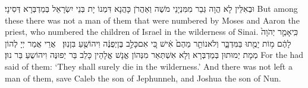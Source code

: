 {וּבְאִלֵּין לָא הֲוָה גְּבַר מִמִּנְיָנֵי מֹשֶׁה וְאַהֲרֹן כָּהֲנָא דִּמְנוֹ יָת בְּנֵי יִשְׂרָאֵל בְּמַדְבְּרָא דְּסִינָי׃}
{But among these there was not a man of them that were numbered by Moses and Aaron the priest, who numbered the children of Israel in the wilderness of Sinai.}{}
{כִּֽי\maqqaf אָמַ֤ר יְהֹוָה֙ לָהֶ֔ם מ֥וֹת יָמֻ֖תוּ בַּמִּדְבָּ֑ר וְלֹא\maqqaf נוֹתַ֤ר מֵהֶם֙ אִ֔ישׁ כִּ֚י אִם\maqqaf כָּלֵ֣ב בֶּן\maqqaf יְפֻנֶּ֔ה וִיהוֹשֻׁ֖עַ בִּן\maqqaf נֽוּן׃ \setuma }
{אֲרֵי אֲמַר יְיָ לְהוֹן מְמָת יְמוּתוּן בְּמַדְבְּרָא וְלָא אִשְׁתְּאַר מִנְּהוֹן אֱנָשׁ אֱלָהֵין כָּלֵב בַּר יְפוּנֶּה וִיהוֹשֻעַ בַּר נוּן׃}
{For the \lord\space had said of them: ‘They shall surely die in the wilderness.’ And there was not left a man of them, save Caleb the son of Jephunneh, and Joshua the son of Nun.}{}

